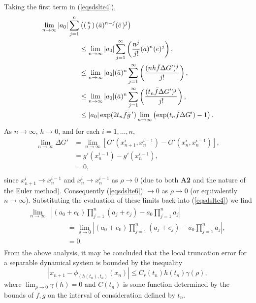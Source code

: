 \begin{prf}
Taking the first term in (\ref{eqsdslte4}),
\begin{align}
  \lim_{n \to \infty}  |a_0| \sum_{j=1}^{n} &\left( \left(
      \begin{smallmatrix}
       n \\
       j
       \end{smallmatrix}
       \right)
       (\bar{a})^{n-j}  (\bar{e}\,)^j \right) \notag \\
   & \leq \lim_{n \to \infty} |a_0| \sum_{j=1}^{\infty} \left( \frac{n^j}{j!}
       (\bar{a})^n (\bar{e})^j \right), \notag \\
  & \leq \lim_{n \to \infty} |a_0|  (\bar{a})^n \sum_{j=1}^{\infty} \left(
      \frac{(n h \bar{f} \Delta G')^j}{j!} \right), \notag \\
  & \leq \lim_{n \to \infty} |a_0|  (\bar{a})^n \sum_{j=1}^{\infty} \left(
      \frac{(t_n \bar{f} \Delta G')^j}{j!} \right), \notag \\
  & \leq |a_0| \exp(2 t_n \bar{f} \bar{g}\,') \lim_{n \to \infty} \left( \exp(
      t_n \bar{f} \Delta G') - 1 \right). \label{eqsdslte6}
\end{align}
As $n \to \infty$, $h \to 0$, and for each $i = 1, \dots, n$,
\begin{align*}
  \lim_{n \to \infty} \Delta G' &= \lim_{n \to \infty} [
           G'(x^i_{n+1},x^{i-1}_n) - G'(x^i_n, x^{i-1}_n) ], \\
  &=  g'(x^{i-1}_n) - g'(x^{i-1}_n), \\
  &= 0, \\
\end{align*}
since $x^i_{n+1} \to x^{i-1}_n$ and $x^i_{n} \to x^{i-1}_n$ as $\rho \to 0$ (due
to both \textbf{A2} and the nature of the Euler method). Consequently
(\ref{eqsdslte6}) $\to 0$ as $\rho \to 0$ (or equivalently $n \to \infty$).
Substituting the evaluation of these limits back into (\ref{eqsdslte4}) we find
\begin{align*}
 \lim_{n \to \infty} &\left| (a_0 + e_0) \prod_{j=1}^n (a_j +
       e_j)  -  a_0 \prod_{j=1}^{n} a_j \right|  \\
  & \hspace{1cm} = \lim_{\rho \to 0} \left| (a_0 + e_0) \prod_{j=1}^n (a_j +
       e_j)  -  a_0 \prod_{j=1}^{n} a_j \right|, \\
  & \hspace{1cm} = 0. \\
\end{align*}
From the above analysis, it may be concluded that the  local
truncation error for a separable dynamical system is bounded by the inequality
\[ \left| x_{n+1} - \phi_{(h(t_n), t_n)}(x_n)\right| \leq C_r(t_n) h(t_n)
  \gamma(\rho), \]
where $\lim_{\rho \to 0} \gamma(h) = 0$ and $C(t_n)$ is some function determined
by the bounds of $f, g$ on the interval of consideration defined by $t_n$.
\end{prf}


